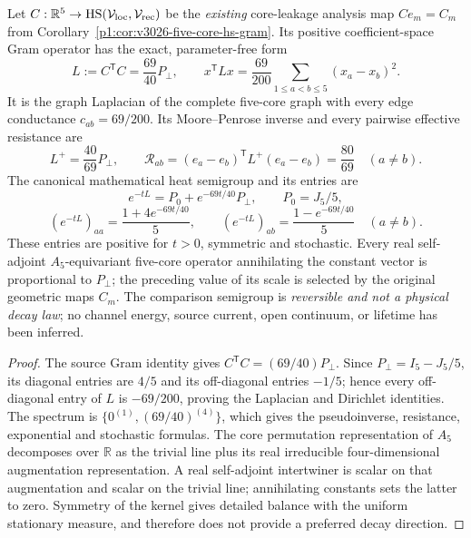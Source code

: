 \documentclass[11pt]{article}
\begin{document}
\begin{theorem}
\label{p1b:thm:v371-five-core-resistance-rigidity}
Let $C:\mathbb R^5\to\operatorname{HS}(\mathcal V_{\rm loc},\mathcal V_{\rm rec})$
be the \emph{existing} core-leakage analysis map $Ce_m=C_m$ from
Corollary~\ref{p1:cor:v3026-five-core-hs-gram}.  Its positive
coefficient-space Gram operator has the exact, parameter-free form
\[
 \boxed{L:=C^{\mathsf T}C=\frac{69}{40}P_\perp,
 \qquad x^{\mathsf T}Lx=\frac{69}{200}
                   \sum_{1\le a<b\le5}(x_a-x_b)^2.}
\]
It is the graph Laplacian of the complete five-core graph with every
edge conductance $c_{ab}=69/200$. Its Moore--Penrose inverse and every
pairwise effective resistance are
\[
 \boxed{L^+=\frac{40}{69}P_\perp,\qquad
 \mathcal R_{ab}=(e_a-e_b)^{\mathsf T}L^+(e_a-e_b)
   =\frac{80}{69}\quad(a\ne b).}
\]
The canonical mathematical heat semigroup and its entries are
\[
 e^{-tL}=P_0+e^{-69t/40}P_\perp,\qquad P_0=J_5/5,
\]
\[
 (e^{-tL})_{aa}=\frac{1+4e^{-69t/40}}5,\qquad
 (e^{-tL})_{ab}=\frac{1-e^{-69t/40}}5\quad(a\ne b).
\]
These entries are positive for $t>0$, symmetric and stochastic. Every
real self-adjoint $A_5$-equivariant five-core operator annihilating the
constant vector is proportional to $P_\perp$; the preceding value of
its scale is selected by the original geometric maps $C_m$.
The comparison semigroup is \emph{reversible and not a physical decay
law}; no channel energy, source current, open continuum, or lifetime has
been inferred.
\end{theorem}
\begin{proof}
The source Gram identity gives $C^{\mathsf T}C=(69/40)P_\perp$.
Since $P_\perp=I_5-J_5/5$, its diagonal entries are $4/5$ and its
off-diagonal entries $-1/5$; hence every off-diagonal entry of $L$
is $-69/200$, proving the Laplacian and Dirichlet identities.
The spectrum is $\{0^{(1)},(69/40)^{(4)}\}$, which gives the
pseudoinverse, resistance, exponential and stochastic formulas.
The core permutation representation of $A_5$ decomposes over
$\mathbb R$ as the trivial line plus its real irreducible
four-dimensional augmentation representation.  A real self-adjoint
intertwiner is scalar on that augmentation and scalar on the trivial
line; annihilating constants sets the latter to zero.  Symmetry
of the kernel gives detailed balance with the uniform stationary
measure, and therefore does not provide a preferred decay direction.
\end{proof}
\end{document}
